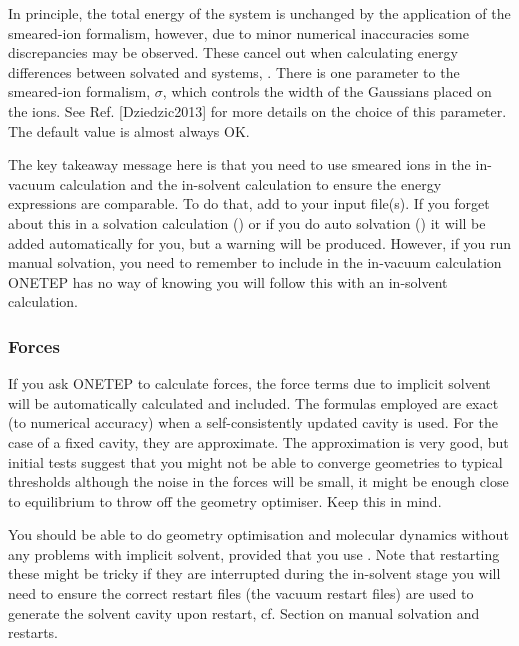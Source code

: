 \documentclass[letterpaper,10pt,english]{sphinxmanual}
\begin{document}
In principle, the total energy of the system is unchanged by the
application of the smeared-ion formalism, however, due to minor
numerical inaccuracies some discrepancies may be observed. These cancel
out when calculating energy differences between solvated and 
systems, . There is one parameter to the
smeared-ion formalism, \(\sigma\), which controls the width of the
Gaussians placed on the ions. See Ref. {[}Dziedzic2013{]} for more details on the choice
of this parameter. The default value is almost always OK.

The key takeaway message here is that you need to use smeared ions in
 the in-vacuum calculation and the in-solvent calculation to
ensure the energy expressions are comparable. To do that, add
 to your input file(s). If you forget about this
in a solvation calculation () or if you do auto solvation
() it will be added automatically for you, but a
warning will be produced. However, if you run manual solvation, you need
to remember to include  in the in-vacuum
calculation \textendash{} ONETEP has no way of knowing you will follow this with an
in-solvent calculation.


\subsubsection{Forces}
\label{\detokenize{implicit_solvation_v3:forces}}
If you ask ONETEP to calculate forces, the force terms due to implicit
solvent will be automatically calculated and included. The formulas
employed are exact (to numerical accuracy) when a self-consistently
updated cavity is used. For the case of a fixed cavity, they are
approximate. The approximation is very good, but initial tests suggest
that you might not be able to converge geometries to typical thresholds
\textendash{} although the noise in the forces will be small, it might be enough
close to equilibrium to throw off the geometry optimiser. Keep this in
mind.

You should be able to do geometry optimisation and molecular dynamics
without any problems with implicit solvent, provided that you use
. Note that restarting these might be tricky if
they are interrupted during the in-solvent stage \textendash{} you will need to
ensure the correct restart files (the vacuum restart files) are used to
generate the solvent cavity upon restart,
cf. Section on manual solvation and restarts.
\end{document}
